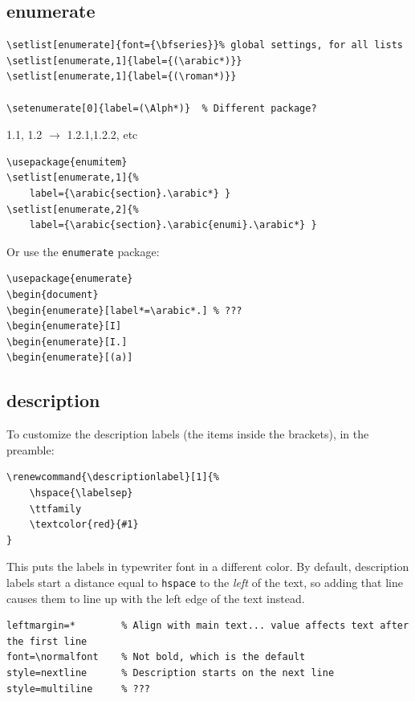 \documentclass{article}
\renewcommand{\descriptionlabel}[1]{%
    \ttfamily\textcolor{cadet}{#1}
}
\begin{document}
\subsection{enumerate}
\begin{lstlisting}
\setlist[enumerate]{font={\bfseries}}% global settings, for all lists
\setlist[enumerate,1]{label={(\arabic*)}}
\setlist[enumerate,1]{label={(\roman*)}}

\setenumerate[0]{label=(\Alph*)}  % Different package?
\end{lstlisting}

1.1, 1.2 $\rightarrow$ 1.2.1,1.2.2, etc
\begin{lstlisting}
\usepackage{enumitem}
\setlist[enumerate,1]{%
    label={\arabic{section}.\arabic*} }
\setlist[enumerate,2]{%
    label={\arabic{section}.\arabic{enumi}.\arabic*} }
\end{lstlisting}
Or use the \texttt{enumerate} package:
\begin{lstlisting}
\usepackage{enumerate}
\begin{document}
\begin{enumerate}[label*=\arabic*.] % ???
\begin{enumerate}[I]
\begin{enumerate}[I.]
\begin{enumerate}[(a)]
\end{lstlisting}

\subsection{description}
To customize the description labels (the items inside the brackets), in the preamble:
\begin{lstlisting}
\renewcommand{\descriptionlabel}[1]{%
    \hspace{\labelsep}
    \ttfamily
    \textcolor{red}{#1}
}
\end{lstlisting}
This puts the labels in typewriter font in a different color.
By default, description labels start a distance equal to
\texttt{hspace} to the \emph{left} of the text, so adding that line
causes them to line up with the left edge of the text instead.

\begin{lstlisting}
leftmargin=*        % Align with main text... value affects text after the first line
font=\normalfont    % Not bold, which is the default
style=nextline      % Description starts on the next line
style=multiline     % ???
\end{lstlisting}
\end{document}
